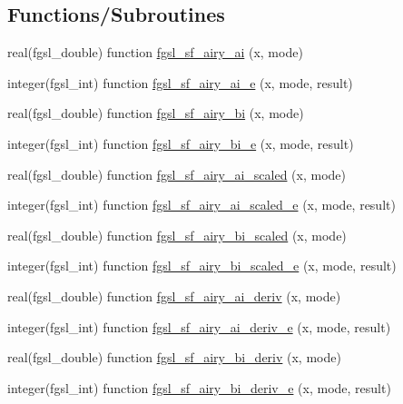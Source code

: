 \subsection*{Functions/\+Subroutines}
\begin{DoxyCompactItemize}
\item 
real(fgsl\+\_\+double) function \hyperlink{specfunc_8finc_a0a9cb6f83b4092fd74711030c2ce7a51}{fgsl\+\_\+sf\+\_\+airy\+\_\+ai} (x, mode)
\item 
integer(fgsl\+\_\+int) function \hyperlink{specfunc_8finc_aae74426785db074c7469d742379ce839}{fgsl\+\_\+sf\+\_\+airy\+\_\+ai\+\_\+e} (x, mode, result)
\item 
real(fgsl\+\_\+double) function \hyperlink{specfunc_8finc_ac8715e3bab2797eaae8b23af36409624}{fgsl\+\_\+sf\+\_\+airy\+\_\+bi} (x, mode)
\item 
integer(fgsl\+\_\+int) function \hyperlink{specfunc_8finc_a556a6d52466a83c16d32407abc301192}{fgsl\+\_\+sf\+\_\+airy\+\_\+bi\+\_\+e} (x, mode, result)
\item 
real(fgsl\+\_\+double) function \hyperlink{specfunc_8finc_a95c23bef46cbe6739e304b7c5f9c8846}{fgsl\+\_\+sf\+\_\+airy\+\_\+ai\+\_\+scaled} (x, mode)
\item 
integer(fgsl\+\_\+int) function \hyperlink{specfunc_8finc_acdf1711fdbaa7e6053fb2df543bd6a57}{fgsl\+\_\+sf\+\_\+airy\+\_\+ai\+\_\+scaled\+\_\+e} (x, mode, result)
\item 
real(fgsl\+\_\+double) function \hyperlink{specfunc_8finc_a20d61b75eb06b8f739012682165eb8ac}{fgsl\+\_\+sf\+\_\+airy\+\_\+bi\+\_\+scaled} (x, mode)
\item 
integer(fgsl\+\_\+int) function \hyperlink{specfunc_8finc_adfc309f1d316dfd0727966cd8376ecc0}{fgsl\+\_\+sf\+\_\+airy\+\_\+bi\+\_\+scaled\+\_\+e} (x, mode, result)
\item 
real(fgsl\+\_\+double) function \hyperlink{specfunc_8finc_a8cccae83c96b49f243622c2376f6c79c}{fgsl\+\_\+sf\+\_\+airy\+\_\+ai\+\_\+deriv} (x, mode)
\item 
integer(fgsl\+\_\+int) function \hyperlink{specfunc_8finc_a5a2b51dce047483401907c6f8a700a24}{fgsl\+\_\+sf\+\_\+airy\+\_\+ai\+\_\+deriv\+\_\+e} (x, mode, result)
\item 
real(fgsl\+\_\+double) function \hyperlink{specfunc_8finc_a94ab39a6b0392152feab691f5db95887}{fgsl\+\_\+sf\+\_\+airy\+\_\+bi\+\_\+deriv} (x, mode)
\item 
integer(fgsl\+\_\+int) function \hyperlink{specfunc_8finc_a9a8b6c05c9a91fdcd6606152ea3ae60e}{fgsl\+\_\+sf\+\_\+airy\+\_\+bi\+\_\+deriv\+\_\+e} (x, mode, result)

\end{DoxyCompactItemize}
